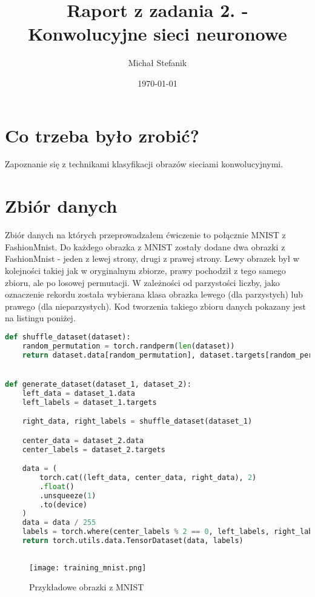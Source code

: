 \documentclass[a4paper]{article}
\author{Michał Stefanik}
\date{\today}
\title{Raport z zadania 2. - Konwolucyjne sieci neuronowe}
\begin{document}
\maketitle
\section{Co trzeba było zrobić?}

Zapoznanie się z technikami klasyfikacji obrazów sieciami konwolucyjnymi.

\section{Zbiór danych}

Zbiór danych na których przeprowadzałem ćwiczenie to połącznie MNIST z FashionMnist.
Do każdego obrazka z MNIST zostały dodane dwa obrazki z FashionMnist - jeden z lewej strony,
drugi z prawej strony. Lewy obrazek był w kolejności takiej jak w oryginalnym zbiorze,
prawy pochodził z tego samego zbioru, ale po losowej permutacji. W zależności od
parzystości liczby, jako oznaczenie rekordu została wybierana klasa obrazka
lewego (dla parzystych) lub prawego (dla nieparzystych). Kod tworzenia takiego
zbioru danych pokazany jest na listingu poniżej.

\begin{lstlisting}[language=Python]
def shuffle_dataset(dataset):
    random_permutation = torch.randperm(len(dataset))
    return dataset.data[random_permutation], dataset.targets[random_permutation]


def generate_dataset(dataset_1, dataset_2):
    left_data = dataset_1.data
    left_labels = dataset_1.targets

    right_data, right_labels = shuffle_dataset(dataset_1)

    center_data = dataset_2.data
    center_labels = dataset_2.targets

    data = (
        torch.cat((left_data, center_data, right_data), 2)
        .float()
        .unsqueeze(1)
        .to(device)
    )
    data = data / 255
    labels = torch.where(center_labels % 2 == 0, left_labels, right_labels).to(device)
    return torch.utils.data.TensorDataset(data, labels)
    
\end{lstlisting}

\begin{figure}[H]
    \centering
    \texttt{[image: training\_mnist.png]}
    \caption{Przykładowe obrazki z MNIST}
    \label{fig:mnist}
\end{figure}
\end{document}
